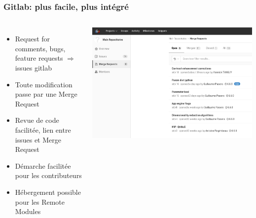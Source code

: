 \documentclass[8pt]{beamer}
\begin{document}
\begin{frame}
  \frametitle{Gitlab: plus facile, plus intégré}
  \begin{columns}
    \begin{itemize}
    \item Request for comments, bugs, feature requests $\Rightarrow$ issues gitlab
    \item Toute modification passe par une Merge Request
    \item Revue de code facilitée, lien entre issues et Merge Request
    \item Démarche facilitée pour les contributeurs
    \item Hébergement possible pour les Remote Modules
    \end{itemize}
    \includegraphics[width=\textwidth]{images/gitlab_mr.png}
    \end{columns}
\end{frame}
\end{document}
